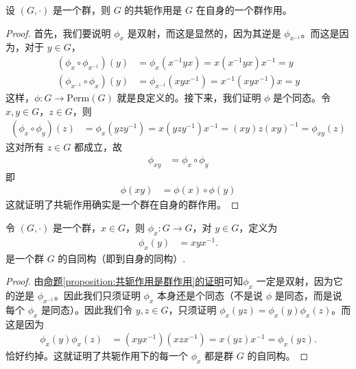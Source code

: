 \documentclass[../../main.tex]{subfiles}
\begin{document}
\begin{proposition}\label{proposition:共轭作用是群作用}
设 \((G, \cdot)\) 是一个群，则 \(G\) 的共轭作用是 \(G\) 在自身的一个群作用。
\end{proposition}
\begin{proof}
首先，我们要说明 \(\phi_x\) 是双射，而这是显然的，因为其逆是 \(\phi_{x^{-1}}\)。而这是因为，对于 \(y \in G\)，
\begin{align*}
(\phi_x \circ \phi_{x^{-1}})(y) &= \phi_x(x^{-1}yx) = x(x^{-1}yx)x^{-1} = y\\
(\phi_{x^{-1}} \circ \phi_x)(y) &= \phi_{x^{-1}}(xyx^{-1}) = x^{-1}(xyx^{-1})x = y
\end{align*}
这样，\(\phi: G \to \mathrm{Perm}(G)\) 就是良定义的。接下来，我们证明 \(\phi\) 是个同态。令 \(x, y \in G\)，\(z \in G\)，则
\begin{align*}
(\phi_x \circ \phi_y)(z) &= \phi_x(yzy^{-1}) = x(yzy^{-1})x^{-1} = (xy)z(xy)^{-1} = \phi_{xy}(z)
\end{align*}
这对所有 \(z \in G\) 都成立，故
\begin{align*}
\phi_{xy} &= \phi_x \circ \phi_y
\end{align*}
即
\begin{align*}
\phi(xy) &= \phi(x) \circ \phi(y)
\end{align*}
这就证明了共轭作用确实是一个群在自身的群作用。 
\end{proof}

\begin{proposition}
令 \((G, \cdot)\) 是一个群，\(x \in G\)，则 \(\phi_x: G \to G\)，对 \(y \in G\)，定义为
\begin{align*}
\phi_x(y) &= xyx^{-1} .
\end{align*}
是一个群 \(G\) 的自同构（即到自身的同构）.
\end{proposition}
\begin{proof}
由\hyperref[proposition:共轭作用是群作用]{命题\ref{proposition:共轭作用是群作用}的证明}可知\(\phi_x\) 一定是双射，因为它的逆是 \(\phi_{x^{-1}}\)。因此我们只须证明 \(\phi_x\) 本身还是个同态（不是说 \(\phi\) 是同态，而是说每个 \(\phi_x\) 是同态）。因此我们令 \(y, z \in G\)，只须证明 \(\phi_x(yz) = \phi_x(y)\phi_x(z)\)。而这是因为
\begin{align*}
\phi_x(y)\phi_x(z) &= (xyx^{-1})(xzx^{-1}) = x(yz)x^{-1} = \phi_x(yz).
\end{align*}
恰好约掉。这就证明了共轭作用下的每一个 \(\phi_x\) 都是群 \(G\) 的自同构。 
\end{proof}
\end{document}
